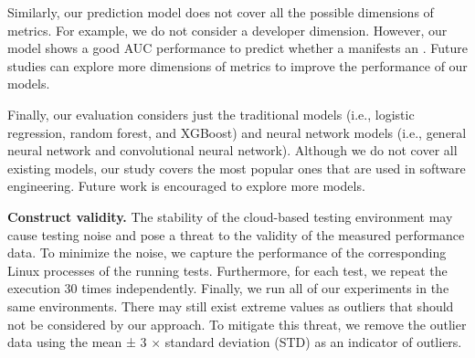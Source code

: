 Similarly, our prediction model does not cover all the possible dimensions of metrics. For example, we do not consider a developer dimension. However, our model shows a good AUC performance to predict whether a \instance manifests an \inconsistent. Future studies can explore more dimensions of metrics to improve the performance of our models. 

Finally, our evaluation considers just the traditional models (i.e., logistic regression, random forest, and XGBoost) and neural network models (i.e., general neural network and convolutional neural network). Although we do not cover all existing models, our study covers the most popular ones that are used in software engineering. Future work is encouraged to explore more models. 




\noindent \textbf{Construct validity.} %
The stability of the cloud-based testing environment may cause testing noise and pose a threat to the validity of the measured performance data. To minimize the noise, we capture the performance of the corresponding Linux processes of the running tests. Furthermore, for each test, we repeat the execution 30 times independently. Finally, we run all of our experiments in the same environments. There may still exist extreme values as outliers that should not be considered by our approach. To mitigate this threat, we remove the outlier data using the mean ± 3 × standard deviation (STD) as an indicator of outliers.

